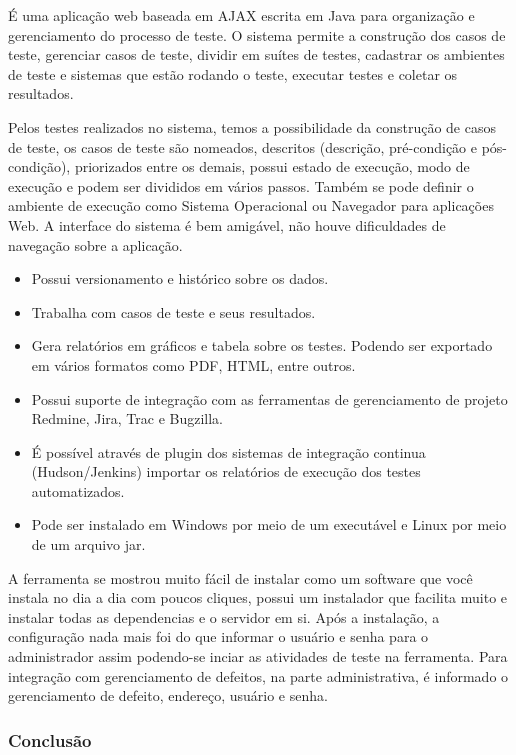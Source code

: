 \documentclass[12pt,a4paper]{article}
\begin{document}
			É uma aplicação web baseada em AJAX escrita em Java para organização e gerenciamento do processo de teste. O sistema
			permite a construção dos casos de teste, gerenciar casos de teste, dividir em suítes de testes, cadastrar os
			ambientes de teste e sistemas que estão rodando o teste, executar testes e coletar os resultados.
			
			Pelos testes realizados no sistema, temos a possibilidade da construção de casos de teste, os casos de teste são
			nomeados, descritos (descrição, pré-condição e pós-condição), priorizados entre os demais, possui estado de
			execução, modo de execução e podem ser divididos em vários passos. Também se pode definir o ambiente de execução
			como Sistema Operacional ou Navegador para aplicações Web. A interface do sistema é bem amigável, não houve
			dificuldades de navegação sobre a aplicação.
			
			\begin{itemize}
			  \item Possui versionamento e histórico sobre os dados.
			  \item Trabalha com casos de teste e seus resultados.
			  \item Gera relatórios em gráficos e tabela sobre os testes. Podendo ser exportado em vários formatos como PDF,
			  HTML, entre outros.
			  \item Possui suporte de integração com as ferramentas de gerenciamento de projeto Redmine, Jira, Trac e Bugzilla.
			  \item É possível através de plugin dos sistemas de integração continua (Hudson/Jenkins) importar os relatórios de
			  execução dos testes automatizados.
			  \item Pode ser instalado em Windows por meio de um executável e Linux por meio de um arquivo jar.
			\end{itemize}
			
			A ferramenta se mostrou muito fácil de instalar como um software que você instala no dia a dia com poucos cliques,
			possui um instalador que facilita muito e instalar todas as dependencias e o servidor em si. Após a instalação, a
			configuração nada mais foi do que informar o usuário e senha para o administrador assim podendo-se inciar as
			atividades de teste na ferramenta. Para integração com gerenciamento de defeitos, na parte administrativa, é
			informado o gerenciamento de defeito, endereço, usuário e senha. 
			
		\subsubsection{Conclusão}
\end{document}
